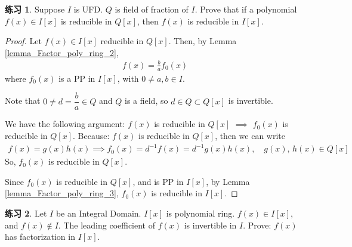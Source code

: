 \documentclass[utf8]{ctexbook}
\theoremstyle{definition}
\newtheorem{exercise}{练习}[section]
\begin{document}
\begin{exercise}
Suppose $I$ is UFD. $Q$ is field of fraction of $I$. Prove that if a polynomial $f(x) \in I[x]$ is reducible in $Q[x]$, then $f(x)$ is reducible in $I[x]$.
\end{exercise}

\begin{proof}
Let $f(x) \in I[x] $ reducible in $Q[x]$. Then, by Lemma \ref{lemma_Factor_poly_ring_2}, 
\begin{align*}
f(x) = \frac{b}{a} f_0 (x)
\end{align*}
where $f_0 (x)$ is a PP in $I[x]$, with $0 \neq a, b \in I$.

Note that $0 \neq d = \dfrac{b}{a} \in Q$ and $Q$ is a field, so $d \in Q \subset Q[x]$ is invertible.

We have the following argument: $f(x)$ is reducible in $Q[x]$ $\implies$ $f_0 (x)$ is reducible in $Q[x]$. Because: $f(x)$ is reducible in $Q[x]$, then we can write 
\begin{align*}
f(x) = g(x) h(x) \implies f_0 (x) = d^{-1} f(x) = d^{-1} g(x) h(x), \quad g(x),\, h(x) \in Q[x]
\end{align*}
So, $f_0 (x)$ is reducible in $Q[x]$.

Since $f_0 (x)$ is reducible in $Q[x]$, and is PP in $I[x]$, by Lemma \ref{lemma_Factor_poly_ring_3}, $f_0 (x)$ is reducible in $I[x]$.
\end{proof}


\begin{exercise}
Let $I$ be an Integral Domain. $I[x]$ is polynomial ring. $f(x) \in I[x]$, and $f(x) \not \in I$. The leading coefficient of $f(x)$ is invertible in $I$. Prove: $f(x)$ has factorization in $I[x]$.
\end{exercise}
\end{document}
